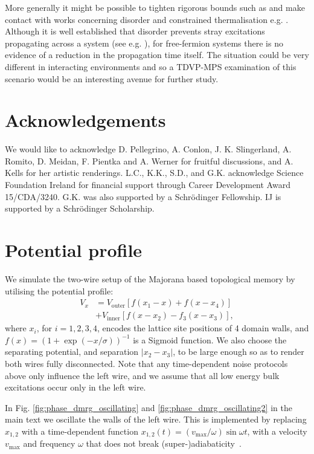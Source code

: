 \documentclass[aps,pra,floatfix,footinbib,longbibliography,twocolumn,superscriptaddress, preprintnumbers, nobibnotes]{revtex4-1}
\begin{document}
More generally it might be possible to tighten rigorous bounds such as \cite{Bravyi2010h} and make contact with works concerning disorder and constrained thermalisation e.g.  \cite{Huse2013, Else2017, Kells2018b, Nulty2020}.  Although it is well established that disorder prevents stray excitations propagating across a system (see e.g. \cite{Conlon2019}), for free-fermion systems there is no evidence of a reduction in the propagation time itself. The situation could be very different in interacting environments and so a TDVP-MPS examination of this scenario would be an interesting avenue for further study. 

\section*{Acknowledgements}
We would like to acknowledge D. Pellegrino, A. Conlon, J. K. Slingerland, A. Romito, D. Meidan, F. Pientka and A. Werner for fruitful discussions, and A. Kells for her artistic renderings. L.C., K.K., S.D., and G.K. acknowledge Science Foundation Ireland for financial support through Career Development Award 15/CDA/3240. G.K. was also supported by a Schr\"{o}dinger Fellowship. IJ is supported by a Schr\"{o}dinger Scholarship.

\appendix

\section{Potential profile}\label{sec:numerical_setup}\label{app:MajoranaDetail}
We simulate the two-wire setup of the Majorana based topological memory by utilising the potential profile:
\begin{equation}
\label{eq:Potential}
\begin{split}
    V_x &= V_{\text{outer}} [ f(x_1-x)+f(x-x_4)] \\ 
    &+ V_{\text{inner}} [ f(x-x_2)-f_3(x-x_3) ],
\end{split}
\end{equation}
where $x_i$, for $i=1,2,3,4$, encodes the lattice site positions of 4 domain walls, and $f(x)= (1+\exp(-x/\sigma))^{-1}$ is a Sigmoid function. We also choose the separating potential, and separation $|x_{2}-x_{3}|$, to be large enough so as to render both wires fully disconnected. Note that any time-dependent noise protocols above only influence the left wire, and we assume that all low energy bulk excitations occur only in the left wire. 

In Fig. \ref{fig:phase_dmrg_oscillating} and \ref{fig:phase_dmrg_oscillating2} in the main text we oscillate the walls of the left wire. This is implemented by replacing $x_{1,2}$ with a time-dependent function $x_{1,2}(t)=( v_{\text{max}}/\omega ) \sin{\omega t}$, with a velocity $v_{\text{max}}$ and frequency $\omega$ that does not break \newline(super-)adiabaticity~\cite{Karzig2013,Scheurer2013,Conlon2019,
coopmans2020protocol}. 
\end{document}
